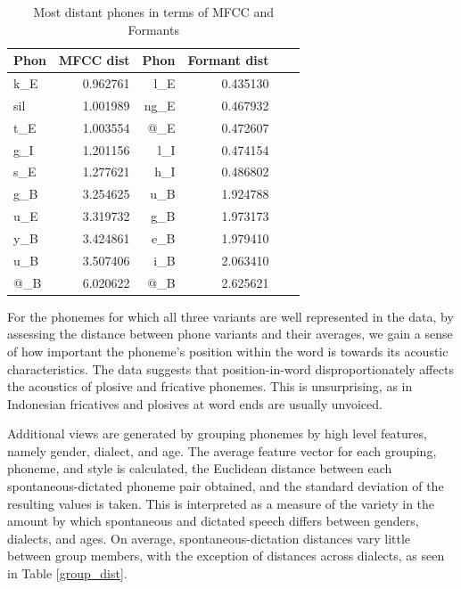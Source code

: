 \documentclass[conference]{IEEEtran}
\begin{document}
\begin{table}[!htb]
\renewcommand{\arraystretch}{1.3}
\caption{Most distant phones in terms of MFCC and Formants}
\label{mfc_frm}
\centering
\begin{tabular}{|l|r|r|r|r|r|}
    \hline
    Phon & MFCC dist & Phon & Formant dist \\
    \hline
    k\_E  &  0.962761 & l\_E  &  0.435130 \\
    sil   &  1.001989 & ng\_E &  0.467932 \\
    t\_E  &  1.003554 & @\_E  &  0.472607 \\
    g\_I  &  1.201156 & l\_I  &  0.474154 \\
    s\_E  &  1.277621 & h\_I  &  0.486802 \\
    \hline
    g\_B  &  3.254625 & u\_B  &  1.924788 \\
    u\_E  &  3.319732 & g\_B  &  1.973173 \\
    y\_B  &  3.424861 & e\_B  &  1.979410 \\
    u\_B  &  3.507406 & i\_B  &  2.063410 \\
    @\_B  &  6.020622 & @\_B  &  2.625621 \\
    \hline
\end{tabular}
\end{table}

For the phonemes for which all three variants are well represented in the data, by assessing the distance between phone variants and their averages, we gain a sense of how important the phoneme's position within the word is towards its acoustic characteristics.
The data suggests that position-in-word disproportionately affects the acoustics of plosive and fricative phonemes.
This is unsurprising, as in Indonesian fricatives and plosives at word ends are usually unvoiced.

Additional views are generated by grouping phonemes by high level features, namely gender, dialect, and age.
The average feature vector for each grouping, phoneme, and style is calculated, the Euclidean distance between each spontaneous-dictated phoneme pair obtained, and the standard deviation of the resulting values is taken.
This is interpreted as a measure of the variety in the amount by which spontaneous and dictated speech differs between genders, dialects, and ages.
On average, spontaneous-dictation distances vary little between group members, with the exception of distances across dialects, as seen in Table \ref{group_dist}.
\end{document}
